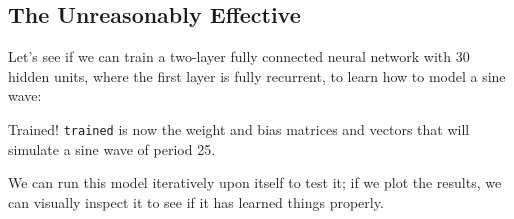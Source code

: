\documentclass[]{article}
\newenvironment{Shaded}{}{}
\newcommand{\CommentTok}[1]{\textcolor[rgb]{0.38,0.63,0.69}{\textit{#1}}}
\newcommand{\DataTypeTok}[1]{\textcolor[rgb]{0.56,0.13,0.00}{#1}}
\newcommand{\DecValTok}[1]{\textcolor[rgb]{0.25,0.63,0.44}{#1}}
\newcommand{\FunctionTok}[1]{\textcolor[rgb]{0.02,0.16,0.49}{#1}}
\newcommand{\KeywordTok}[1]{\textcolor[rgb]{0.00,0.44,0.13}{\textbf{#1}}}
\newcommand{\NormalTok}[1]{#1}
\newcommand{\OperatorTok}[1]{\textcolor[rgb]{0.40,0.40,0.40}{#1}}
\newcommand{\OtherTok}[1]{\textcolor[rgb]{0.00,0.44,0.13}{#1}}
\begin{document}
\subsection{The Unreasonably Effective}\label{the-unreasonably-effective}

Let's see if we can train a two-layer fully connected neural network with 30
hidden units, where the first layer is fully recurrent, to learn how to model a
sine wave:

\begin{Shaded}
\end{Shaded}

Trained! \texttt{trained} is now the weight and bias matrices and vectors that
will simulate a sine wave of period 25.

We can run this model iteratively upon itself to test it; if we plot the
results, we can visually inspect it to see if it has learned things properly.
\end{document}
